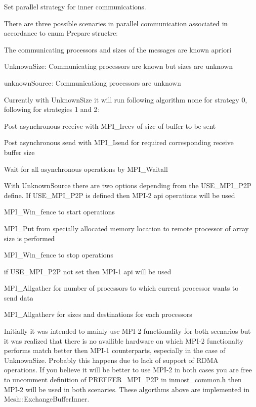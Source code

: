 Set parallel strategy for inner communications. 

There are three possible scenaries in parallel communication associated in accordance to enum Prepare structre\-:
\begin{DoxyEnumerate}
\item The communicating processors and sizes of the messages are known apriori
\item Unknown\-Size\-: Communicating processors are known but sizes are unknown
\item unknown\-Source\-: Communicationg processors are unknown
\end{DoxyEnumerate}

Currently with Unknown\-Size it will run following algorithm none for strategy 0, following for strategies 1 and 2\-:
\begin{DoxyEnumerate}
\item Post asynchronous receive with M\-P\-I\-\_\-\-Irecv of size of buffer to be sent
\item Post asynchronous send with M\-P\-I\-\_\-\-Isend for required corresponding receive buffer size
\item Wait for all asynchronous operations by M\-P\-I\-\_\-\-Waitall
\end{DoxyEnumerate}

With Unknown\-Source there are two options depending from the U\-S\-E\-\_\-\-M\-P\-I\-\_\-\-P2\-P define. If U\-S\-E\-\_\-\-M\-P\-I\-\_\-\-P2\-P is defined then M\-P\-I-\/2 api operations will be used
\begin{DoxyEnumerate}
\item M\-P\-I\-\_\-\-Win\-\_\-fence to start operations
\item M\-P\-I\-\_\-\-Put from specially allocated memory location to remote processor of array size is performed
\item M\-P\-I\-\_\-\-Win\-\_\-fence to stop operations
\end{DoxyEnumerate}

if U\-S\-E\-\_\-\-M\-P\-I\-\_\-\-P2\-P not set then M\-P\-I-\/1 api will be used
\begin{DoxyEnumerate}
\item M\-P\-I\-\_\-\-Allgather for number of processors to which current processor wants to send data
\item M\-P\-I\-\_\-\-Allgatherv for sizes and destinations for each processors
\end{DoxyEnumerate}

Initially it was intended to mainly use M\-P\-I-\/2 functionality for both scenarios but it was realized that there is no availible hardware on which M\-P\-I-\/2 functionalty performs match better then M\-P\-I-\/1 counterparts, especially in the case of Unknown\-Size. Probably this happens due to lack of support of R\-D\-M\-A operations. If you believe it will be better to use M\-P\-I-\/2 in both cases you are free to uncomment definition of P\-R\-E\-F\-F\-E\-R\-\_\-\-M\-P\-I\-\_\-\-P2\-P in \hyperlink{inmost__common_8h_source}{inmost\-\_\-common.\-h} then M\-P\-I-\/2 will be used in both scenaries. These algorthms above are implemented in Mesh\-::\-Exchange\-Buffer\-Inner.

